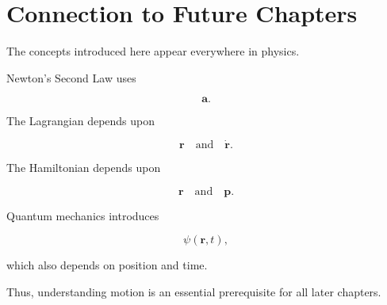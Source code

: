 \section{Connection to Future Chapters}

The concepts introduced here appear everywhere in physics.

Newton's Second Law uses

\[
\mathbf a.
\]

The Lagrangian depends upon

\[
\mathbf r
\quad\text{and}\quad
\dot{\mathbf r}.
\]

The Hamiltonian depends upon

\[
\mathbf r
\quad\text{and}\quad
\mathbf p.
\]

Quantum mechanics introduces

\[
\psi(\mathbf r,t),
\]

which also depends on position and time.

Thus, understanding motion is an essential prerequisite for all later chapters.


